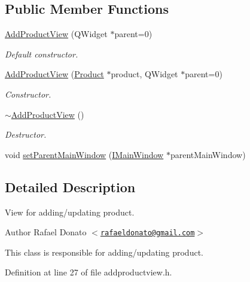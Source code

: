 \subsection*{\-Public \-Member \-Functions}
\begin{DoxyCompactItemize}
\item 
\hyperlink{class_add_product_view_acd08906959201797d5af403e4da16b91}{\-Add\-Product\-View} (\-Q\-Widget $\ast$parent=0)
\begin{DoxyCompactList}\small\item\em \-Default constructor. \end{DoxyCompactList}\item 
\hyperlink{class_add_product_view_a12619b6095def8021a1b9cc4f3fa613b}{\-Add\-Product\-View} (\hyperlink{class_product}{\-Product} $\ast$product, \-Q\-Widget $\ast$parent=0)
\begin{DoxyCompactList}\small\item\em \-Constructor. \end{DoxyCompactList}\item 
\hyperlink{class_add_product_view_a442eb20774b5eebc6248d296df2f6f4b}{$\sim$\-Add\-Product\-View} ()
\begin{DoxyCompactList}\small\item\em \-Destructor. \end{DoxyCompactList}\item 
void \hyperlink{class_add_product_view_ac50d36d066692c018b2144f90b17ed47}{set\-Parent\-Main\-Window} (\hyperlink{class_i_main_window}{\-I\-Main\-Window} $\ast$parent\-Main\-Window)
\end{DoxyCompactItemize}


\subsection{\-Detailed \-Description}
\-View for adding/updating product. 

\begin{DoxyAuthor}{\-Author}
\-Rafael \-Donato $<$\href{mailto:rafaeldonato@gmail.com}{\tt rafaeldonato@gmail.\-com}$>$
\end{DoxyAuthor}
\-This class is responsible for adding/updating product. 

\-Definition at line 27 of file addproductview.\-h.



